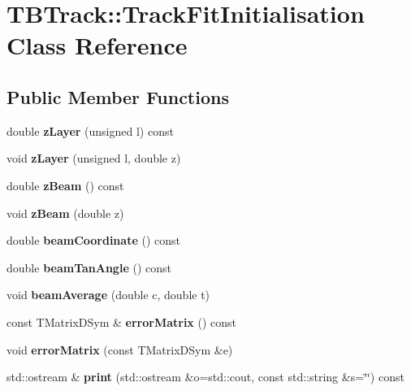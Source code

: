 \section{TBTrack::TrackFitInitialisation Class Reference}
\label{classTBTrack_1_1TrackFitInitialisation}
\subsection*{Public Member Functions}
\begin{DoxyCompactItemize}
\item 
double {\bfseries zLayer} (unsigned l) const \label{classTBTrack_1_1TrackFitInitialisation_a01665c12db631dd5eceddd77bfe937e6}

\item 
void {\bfseries zLayer} (unsigned l, double z)\label{classTBTrack_1_1TrackFitInitialisation_afc1e65452855b3cd19aa5acb48e864f9}

\item 
double {\bfseries zBeam} () const \label{classTBTrack_1_1TrackFitInitialisation_a6bc7c5714057b2e01c19af17c1796ba2}

\item 
void {\bfseries zBeam} (double z)\label{classTBTrack_1_1TrackFitInitialisation_ae22fc580faa11890119c02707405bd07}

\item 
double {\bfseries beamCoordinate} () const \label{classTBTrack_1_1TrackFitInitialisation_a05f677ed046915cf6f8b82a854af182f}

\item 
double {\bfseries beamTanAngle} () const \label{classTBTrack_1_1TrackFitInitialisation_a7524b68beb3cacf9b185ae4ea7e1a81d}

\item 
void {\bfseries beamAverage} (double c, double t)\label{classTBTrack_1_1TrackFitInitialisation_a85507e913f3ff19274ad60673de58bdd}

\item 
const TMatrixDSym \& {\bfseries errorMatrix} () const \label{classTBTrack_1_1TrackFitInitialisation_ac7b30c88b39f27e822c33ea02876cfbb}

\item 
void {\bfseries errorMatrix} (const TMatrixDSym \&e)\label{classTBTrack_1_1TrackFitInitialisation_a12579080a3daa8d4dd257f7cf06e0754}

\item 
std::ostream \& {\bfseries print} (std::ostream \&o=std::cout, const std::string \&s=\char`\"{}\char`\"{}) const \label{classTBTrack_1_1TrackFitInitialisation_a3e2634a59a5ed407409f708755abdcea}

\end{DoxyCompactItemize}
